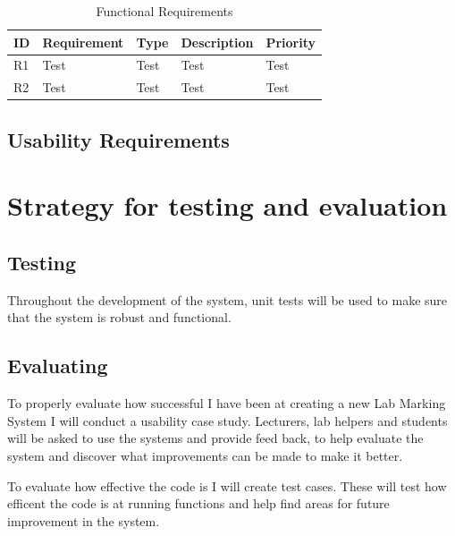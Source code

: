 \documentclass[12pt]{article}  %
\theoremstyle{definition}
\theoremstyle{remark}
\begin{document}
\begin{table}
\begin{tabularx}{\textwidth}{|l|X|X|X|X|}
\hline
  \textbf{ID} & \textbf{Requirement} & \textbf{Type} & \textbf{Description} & \textbf{Priority} 
\\
\hline
R1&Test&Test&Test&Test\\ \hline
R2&Test&Test&Test&Test\\ \hline


\end{tabularx}
\label{table:requirements}
\caption{Functional Requirements}
\end{table}

\subsection{Usability Requirements}







\newpage
\section{Strategy for testing and evaluation}

\subsection{Testing}
Throughout the development of the system, unit tests will be used to make sure that the system is robust and functional. \\

\subsection{Evaluating}
To properly evaluate how successful I have been at creating a new Lab Marking System I will conduct a usability case study. Lecturers, lab helpers and students will be asked to use the systems and provide feed back, to help evaluate the system and discover what improvements can be made to make it better.

To evaluate how effective the code is I will create test cases. These will test how efficent the code is at running functions and help find areas for future improvement in the system.
\end{document}
